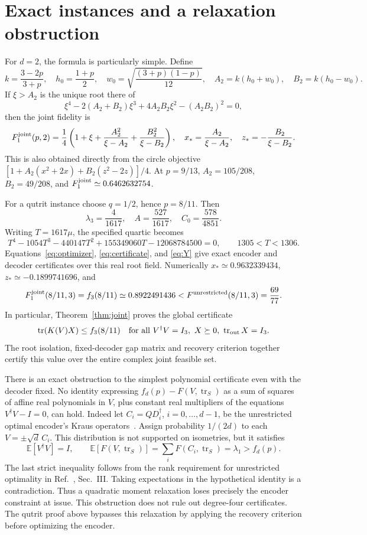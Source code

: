 \documentclass[11pt]{article}
\newcommand{\tr}{\operatorname{tr}}
\begin{document}
\section{Exact instances and a relaxation obstruction}
For $d=2$, the formula is particularly simple. Define
\[
 k=\frac{3-2p}{3+p},\quad h_0=\frac{1+p}{2},\quad
 w_0=\sqrt{\frac{(3+p)(1-p)}{12}},\quad
 A_2=k(h_0+w_0),\quad B_2=k(h_0-w_0).
\]
If $\xi>A_2$ is the unique root there of
\[
 \xi^4-2(A_2+B_2)\xi^3+4A_2B_2\xi^2-(A_2B_2)^2=0,
\]
then the joint fidelity is
\[
 F_1^{\rm joint}(p,2)=\frac14\left(1+\xi+
 \frac{A_2^2}{\xi-A_2}+\frac{B_2^2}{\xi-B_2}\right),\quad
 x_* =\frac{A_2}{\xi-A_2},\quad z_*=-\frac{B_2}{\xi-B_2}.
\]
This is also obtained directly from the circle objective
$[1+A_2(x^2+2x)+B_2(z^2-2z)]/4$.
At $p=9/13$, $A_2=105/208$, $B_2=49/208$, and
$F_1^{\rm joint}\simeq0.6462632754$.

For a qutrit instance choose $q=1/2$, hence $p=8/11$. Then
\[
 \lambda_3=\frac4{1617},\quad A=\frac{527}{1617},\quad
 C_0=\frac{578}{4851}.
\]
Writing $T=1617\mu$, the specified quartic becomes
\begin{equation}\label{eq:qutritquartic}
 T^4-1054T^3-440147T^2+155349060T-12068784500=0,
 \qquad 1305<T<1306.
\end{equation}
Equations~\eqref{eq:optimizer}, \eqref{eq:certificate}, and \eqref{eq:Y}
give exact encoder and decoder certificates over this real root field.
Numerically $x_*\simeq0.9632339434$, $z_*\simeq-0.1899741696$, and
\[
 F_1^{\rm joint}(8/11,3)=f_3(8/11)\simeq0.8922491436
 <F^{\rm unrestricted}(8/11,3)=\frac{69}{77}.
\]
In particular, Theorem~\ref{thm:joint} proves the global certificate
\begin{equation}\label{eq:open}
 \tr(K(V)X)\le f_3(8/11)\quad
 \text{for all }V^\dagger V=I_3,\ X\succeq0,\ \tr_{\rm out}X=I_3.
\end{equation}
The root isolation, fixed-decoder gap matrix and recovery criterion together
certify this value over the entire complex joint feasible set.

There is an exact obstruction to the simplest polynomial certificate even
with the decoder fixed. No identity expressing $f_d(p)-F(V,\tr_S)$ as a sum
of squares of affine real polynomials in $V$, plus constant real multipliers
of the equations $V^\dagger V-I=0$, can hold. Indeed let
$C_i=QD_i^\dagger$, $i=0,\ldots,d-1$, be the unrestricted optimal encoder's
Kraus operators~\cite[Eq.~(19)]{LiJiang}. Assign probability $1/(2d)$ to
each $V=\pm\sqrt d\,C_i$. This distribution is not supported on isometries,
but it satisfies
\[
 \mathbb E[V^\dagger V]=I,\qquad
 \mathbb E[F(V,\tr_S)]=\sum_i F(C_i,\tr_S)=\lambda_1>f_d(p).
\]
The last strict inequality follows from the rank requirement for unrestricted
optimality in Ref.~\cite{LiJiang}, Sec.~III. Taking expectations in the
hypothetical identity is a contradiction. Thus a quadratic moment relaxation
loses precisely the encoder constraint at issue. This obstruction does not
rule out degree-four certificates. The qutrit proof above bypasses this
relaxation by applying the recovery criterion before optimizing the encoder.
\end{document}
